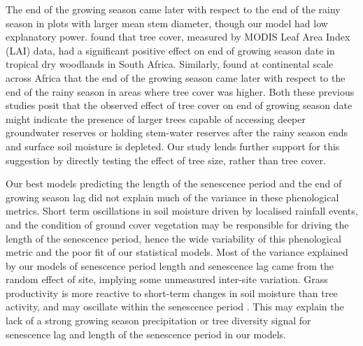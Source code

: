 \documentclass[11pt,a4paper]{article}
\begin{document}
The end of the growing season came later with respect to the end of the rainy
season in plots with larger mean stem diameter, though our model had low
explanatory power. \citet{Cho2017} found that tree cover, measured by MODIS
Leaf Area Index (LAI) data, had a significant positive effect on end of growing
season date in tropical dry woodlands in South Africa. Similarly,
\citet{Guan2014} found at continental scale across Africa that the end of the
growing season came later with respect to the end of the rainy season in areas
where tree cover was higher. Both these previous studies posit that the
observed effect of tree cover on end of growing season date might indicate the
presence of larger trees capable of accessing deeper groundwater reserves or
holding stem-water reserves after the rainy season ends and surface soil
moisture is depleted. Our study lends further support for this suggestion by
directly testing the effect of tree size, rather than tree cover. 

Our best models predicting the length of the senescence period and the end of
growing season lag did not explain much of the variance in these phenological
metrics. Short term oscillations in soil moisture driven by localised rainfall
events, and the condition of ground cover vegetation may be responsible for
driving the length of the senescence period, hence the wide variability of this
phenological metric and the poor fit of our statistical models. Most of the
variance explained by our models of senescence period length and senescence lag
came from the random effect of site, implying some unmeasured inter-site
variation. Grass productivity is more reactive to short-term changes in soil
moisture than tree activity, and may oscillate within the senescence period
\citep{Archibald2007}. This may explain the lack of a strong growing season
precipitation or tree diversity signal for senescence lag and length of the
senescence period in our models.
\end{document}
